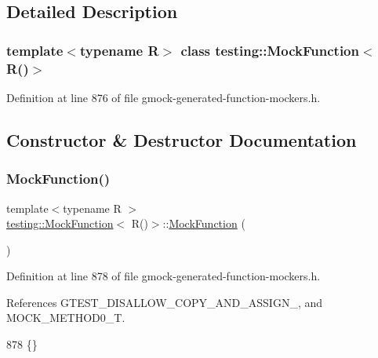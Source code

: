 \subsection{Detailed Description}
\subsubsection*{template$<$typename R$>$\newline
class testing\+::\+Mock\+Function$<$ R()$>$}



Definition at line 876 of file gmock-\/generated-\/function-\/mockers.\+h.



\subsection{Constructor \& Destructor Documentation}
\mbox{\label{classtesting_1_1MockFunction_3_01R_07_08_4_acc6a6896f7f4b116b04e00d5a2088347}} 
\subsubsection{\texorpdfstring{Mock\+Function()}{MockFunction()}}
{\footnotesize\ttfamily template$<$typename R $>$ \\
\hyperlink{classtesting_1_1MockFunction}{testing\+::\+Mock\+Function}$<$ R()$>$\+::\hyperlink{classtesting_1_1MockFunction}{Mock\+Function} (\begin{DoxyParamCaption}{ }\end{DoxyParamCaption})\hspace{0.3cm}{\ttfamily [inline]}}



Definition at line 878 of file gmock-\/generated-\/function-\/mockers.\+h.



References G\+T\+E\+S\+T\+\_\+\+D\+I\+S\+A\+L\+L\+O\+W\+\_\+\+C\+O\+P\+Y\+\_\+\+A\+N\+D\+\_\+\+A\+S\+S\+I\+G\+N\+\_\+, and M\+O\+C\+K\+\_\+\+M\+E\+T\+H\+O\+D0\+\_\+T.


\begin{DoxyCode}
878 \{\}
\end{DoxyCode}


